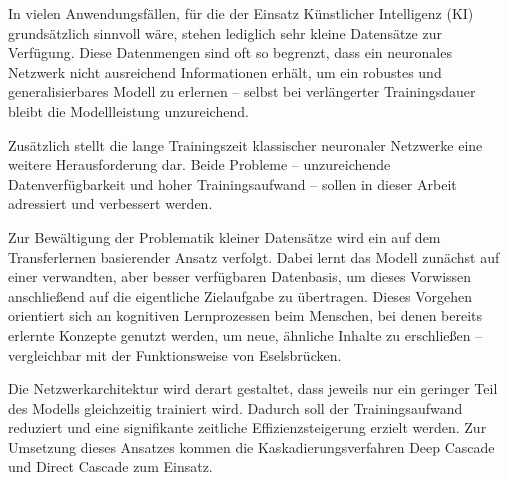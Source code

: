 In vielen Anwendungsfällen, für die der Einsatz Künstlicher Intelligenz (KI) grundsätzlich sinnvoll wäre, stehen lediglich sehr kleine Datensätze 
zur Verfügung. Diese Datenmengen sind oft so begrenzt, dass ein neuronales Netzwerk nicht ausreichend Informationen erhält, um ein robustes und 
generalisierbares Modell zu erlernen – selbst bei verlängerter Trainingsdauer bleibt die Modellleistung unzureichend.

Zusätzlich stellt die lange Trainingszeit klassischer neuronaler Netzwerke eine weitere Herausforderung dar. Beide Probleme – unzureichende 
Datenverfügbarkeit und hoher Trainingsaufwand – sollen in dieser Arbeit adressiert und verbessert werden.

Zur Bewältigung der Problematik kleiner Datensätze wird ein auf dem Transferlernen basierender Ansatz verfolgt. Dabei lernt das Modell zunächst 
auf einer verwandten, aber besser verfügbaren Datenbasis, um dieses Vorwissen anschließend auf die eigentliche Zielaufgabe zu übertragen. Dieses 
Vorgehen orientiert sich an kognitiven Lernprozessen beim Menschen, bei denen bereits erlernte Konzepte genutzt werden, um neue, ähnliche 
Inhalte zu erschließen – vergleichbar mit der Funktionsweise von Eselsbrücken.

Die Netzwerkarchitektur wird derart gestaltet, dass jeweils nur ein geringer Teil des Modells gleichzeitig trainiert wird. Dadurch soll der 
Trainingsaufwand reduziert und eine signifikante zeitliche Effizienzsteigerung erzielt werden. Zur Umsetzung dieses Ansatzes kommen die 
Kaskadierungsverfahren Deep Cascade und Direct Cascade zum Einsatz.
